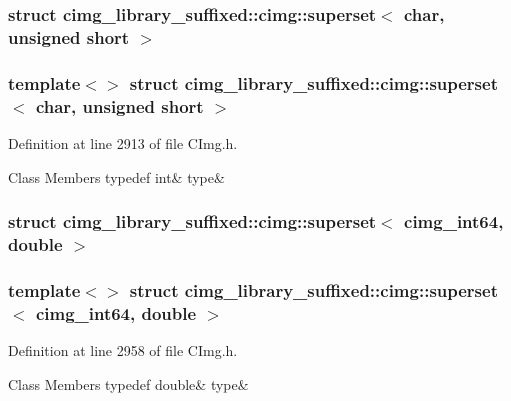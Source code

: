 \subsubsection{struct cimg\+\_\+library\+\_\+suffixed\+:\+:cimg\+:\+:superset$<$ char, unsigned short $>$}
\subsubsection*{template$<$$>$\newline
struct cimg\+\_\+library\+\_\+suffixed\+::cimg\+::superset$<$ char, unsigned short $>$}



Definition at line 2913 of file C\+Img.\+h.

\begin{DoxyFields}{Class Members}
\mbox{\label{namespacecimg__library__suffixed_1_1cimg_a9e62306a3b532983cffd73730b330f99}} 
typedef int&
type&
\\
\hline

\end{DoxyFields}
\label{structcimg__library__suffixed_1_1cimg_1_1superset_3_01cimg__int64_00_01double_01_4}
\subsubsection{struct cimg\+\_\+library\+\_\+suffixed\+:\+:cimg\+:\+:superset$<$ cimg\+\_\+int64, double $>$}
\subsubsection*{template$<$$>$\newline
struct cimg\+\_\+library\+\_\+suffixed\+::cimg\+::superset$<$ cimg\+\_\+int64, double $>$}



Definition at line 2958 of file C\+Img.\+h.

\begin{DoxyFields}{Class Members}
\mbox{\label{namespacecimg__library__suffixed_1_1cimg_a28db5b8df2001ba46063d503ea771c4e}} 
typedef double&
type&
\\
\hline

\end{DoxyFields}
\label{structcimg__library__suffixed_1_1cimg_1_1superset_3_01cimg__int64_00_01float_01_4}
